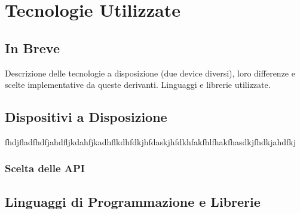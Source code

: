 \chapter{Tecnologie Utilizzate}

\section{In Breve}
Descrizione delle tecnologie a disposizione (due device diversi), loro differenze e scelte implementative da queste derivanti. Linguaggi e librerie utilizzate. 

\section{Dispositivi a Disposizione}
fhdjfladfhdfjahdfljkdahfjkadhflkdhfdkjhfdaskjhfdkhfakfhlfhakfhasdkjfhdkjahdfkj
\subsection{Scelta delle API}
\section{Linguaggi di Programmazione e Librerie}